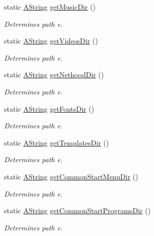 \begin{DoxyCompactItemize}
static \mbox{\hyperlink{class_a_string}{A\+String}} \mbox{\hyperlink{class_dir_a0459c7e45118cdd686df7ac5637182a8}{get\+Music\+Dir}} ()
\begin{DoxyCompactList}\small\item\em Determines path e. \end{DoxyCompactList}\item 
static \mbox{\hyperlink{class_a_string}{A\+String}} \mbox{\hyperlink{class_dir_afeb01994926f5733559cb8b5c7ca7192}{get\+Videos\+Dir}} ()
\begin{DoxyCompactList}\small\item\em Determines path e. \end{DoxyCompactList}\item 
static \mbox{\hyperlink{class_a_string}{A\+String}} \mbox{\hyperlink{class_dir_a0579e37d88f7dbe8647251f8a6187075}{get\+Nethood\+Dir}} ()
\begin{DoxyCompactList}\small\item\em Determines path e. \end{DoxyCompactList}\item 
static \mbox{\hyperlink{class_a_string}{A\+String}} \mbox{\hyperlink{class_dir_a3464ab82944089c65cddb8f7e5ef6f41}{get\+Fonts\+Dir}} ()
\begin{DoxyCompactList}\small\item\em Determines path e. \end{DoxyCompactList}\item 
static \mbox{\hyperlink{class_a_string}{A\+String}} \mbox{\hyperlink{class_dir_a4ed9072929fb9b93cd53ef91e01d26a4}{get\+Templates\+Dir}} ()
\begin{DoxyCompactList}\small\item\em Determines path e. \end{DoxyCompactList}\item 
static \mbox{\hyperlink{class_a_string}{A\+String}} \mbox{\hyperlink{class_dir_abd4058868877e67fad5b73b0998baaba}{get\+Common\+Start\+Menu\+Dir}} ()
\begin{DoxyCompactList}\small\item\em Determines path e. \end{DoxyCompactList}\item 
static \mbox{\hyperlink{class_a_string}{A\+String}} \mbox{\hyperlink{class_dir_a45ed388bd2ce68516bd24f12a8342b00}{get\+Common\+Start\+Programs\+Dir}} ()
\begin{DoxyCompactList}\small\item\em Determines path e. \end{DoxyCompactList}\item 

\end{DoxyCompactItemize}
